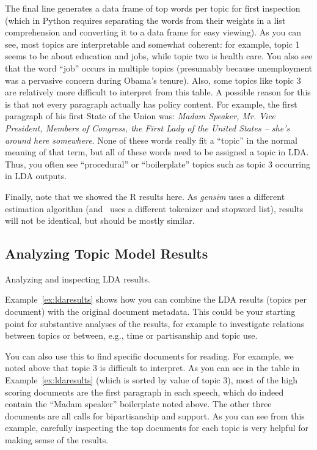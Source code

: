 The final line generates a data frame of top words per topic for first inspection
(which in Python requires separating the words from their weights in a list comprehension and converting it to a data frame for easy viewing).
As you can see, most topics are interpretable and somewhat coherent: for example, topic 1 seems to be about education and jobs,
while topic two is health care. You also see that the word ``job'' occurs in multiple topics (presumably because unemployment was a pervasive concern during Obama's tenure).
Also, some topics like topic 3 are relatively more difficult to interpret from this table.
A possible reason for this is that not every paragraph actually has policy content.
For example, the first paragraph of his first State of the Union was:
\emph{Madam Speaker, Mr. Vice President, Members of Congress, the First Lady of the United States -- she's around here somewhere}.
None of these words really fit a ``topic'' in the normal meaning of that term,
but all of these words need to be assigned a topic in LDA.
Thus, you often see ``procedural'' or ``boilerplate'' topics such as topic 3 occurring in LDA outputs.

Finally, note that we showed the R results here. As \emph{gensim} uses a different estimation algorithm
(and \sklearn\ uses a different tokenizer and stopword list), results will not be identical,
but should be mostly similar.

\subsection{Analyzing Topic Model Results}\label{sec:ldainspect}

\begin{ccsexample}
\caption{Analyzing and inspecting LDA results.}\label{ex:ldaresults}
\end{ccsexample}


Example~\ref{ex:ldaresults} shows how you can combine the LDA results (topics per document)
with the original document metadata.
This could be your starting point for substantive analyses of the results,
for example to investigate relations between topics or between, e.g., time or partisanship and topic use.

You can also use this to find specific documents for reading.
For example, we noted above that topic 3 is difficult to interpret.
As you can see in the table in Example~\ref{ex:ldaresults} (which is sorted by value of topic 3),
most of the high scoring documents are the first paragraph in each speech,
which do indeed contain the ``Madam speaker'' boilerplate noted above.
The other three documents are all calls for bipartisanship and support.
As you can see from this example, carefully inspecting the top documents for each topic
is very helpful for making sense of the results.


